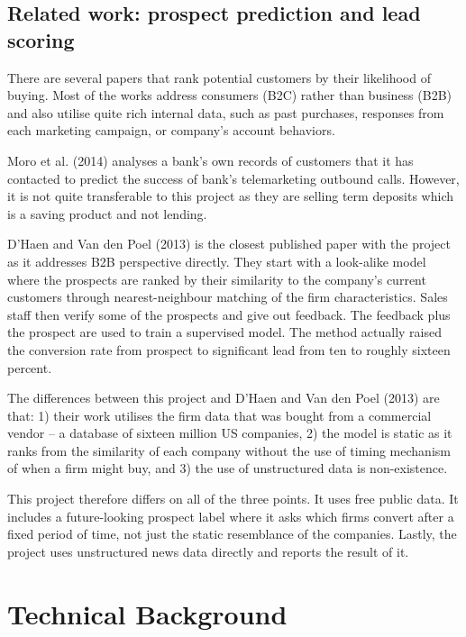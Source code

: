 \documentclass[ %
                    author={Natchalin Iwsakul \\[0.4em] Inkaphol Siriwongwattana \\[0.4em] Tanaphan Kummaraphat \\[0.6em] Patorn Srisupap},,
                supervisor={Fernando Moreno-Pino},
                    degree={MSc},
                     title={Propensity Modelling for SME Commercial Lending Using Open Public Data
},
                  subtitle={Companies House and GDELT as predictors of first-time borrowing},
                      type={},
                      year={2026}]{dissertation}
\begin{document}
\subsection{Related work: prospect prediction and lead scoring}
\label{sec:relatedwork}

There are several papers that rank potential customers by their likelihood of buying. Most of the works address consumers (B2C) rather than business (B2B) and also utilise quite rich internal data, such as past purchases, responses from each marketing campaign, or company's account behaviors.

Moro et al. (2014) analyses a bank's own records of customers that it has contacted to predict the success of bank's telemarketing outbound calls. However, it is not quite transferable to this project as they are selling term deposits which is a saving product and not lending.

D'Haen and Van den Poel (2013) is the closest published paper with the project as it addresses B2B perspective directly. They start with a look-alike model where the prospects are ranked by their similarity to the company's current customers through nearest-neighbour matching of the firm characteristics. Sales staff then verify some of the prospects and give out feedback. The feedback plus the prospect are used to train a supervised model. The method actually raised the conversion rate from prospect to significant lead from ten to roughly sixteen percent.

The differences between this project and D'Haen and Van den Poel (2013) are that: 1) their work utilises the firm data that was bought from a commercial vendor -- a database of sixteen million US companies, 2) the model is static as it ranks from the similarity of each company without the use of timing mechanism of when a firm might buy, and 3) the use of unstructured data is non-existence.

This project therefore differs on all of the three points. It uses free public data. It includes a future-looking prospect label where it asks which firms convert after a fixed period of time, not just the static resemblance of the companies. Lastly, the project uses unstructured news data directly and reports the result of it. 

\section{Technical Background}
\label{sec:technical}
\end{document}

